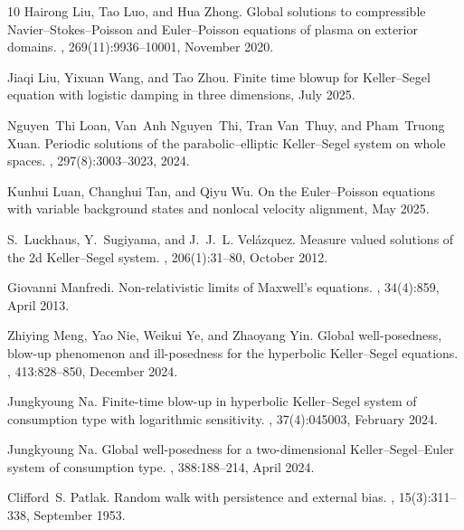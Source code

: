 \documentclass[11pt]{article}
\theoremstyle{plain}
\theoremstyle{definition}
\theoremstyle{remark}
\numberwithin{equation}{section}
\begin{document}
\begin{thebibliography}{10}
Hairong Liu, Tao Luo, and Hua Zhong.
\newblock Global solutions to compressible Navier--Stokes--Poisson and Euler--Poisson equations of plasma on exterior domains.
, 269(11):9936--10001, November 2020.

Jiaqi Liu, Yixuan Wang, and Tao Zhou.
\newblock Finite time blowup for Keller--Segel equation with logistic damping in three dimensions, July 2025.

Nguyen~Thi Loan, Van~Anh Nguyen~Thi, Tran Van~Thuy, and Pham~Truong Xuan.
\newblock Periodic solutions of the parabolic--elliptic Keller--Segel system on whole spaces.
, 297(8):3003--3023, 2024.

Kunhui Luan, Changhui Tan, and Qiyu Wu.
\newblock On the Euler--Poisson equations with variable background states and nonlocal velocity alignment, May 2025.

S.~Luckhaus, Y.~Sugiyama, and J.~J.~L. Velázquez.
\newblock Measure valued solutions of the 2d Keller--Segel system.
, 206(1):31--80, October 2012.

Giovanni Manfredi.
\newblock Non-relativistic limits of Maxwell's equations.
, 34(4):859, April 2013.

Zhiying Meng, Yao Nie, Weikui Ye, and Zhaoyang Yin.
\newblock Global well-posedness, blow-up phenomenon and ill-posedness for the hyperbolic Keller--Segel equations.
, 413:828--850, December 2024.

Jungkyoung Na.
\newblock Finite-time blow-up in hyperbolic Keller--Segel system of consumption type with logarithmic sensitivity.
, 37(4):045003, February 2024.

Jungkyoung Na.
\newblock Global well-posedness for a two-dimensional Keller--Segel--Euler system of consumption type.
, 388:188--214, April 2024.

Clifford~S. Patlak.
\newblock Random walk with persistence and external bias.
, 15(3):311--338, September 1953.


\end{thebibliography}
\end{document}
